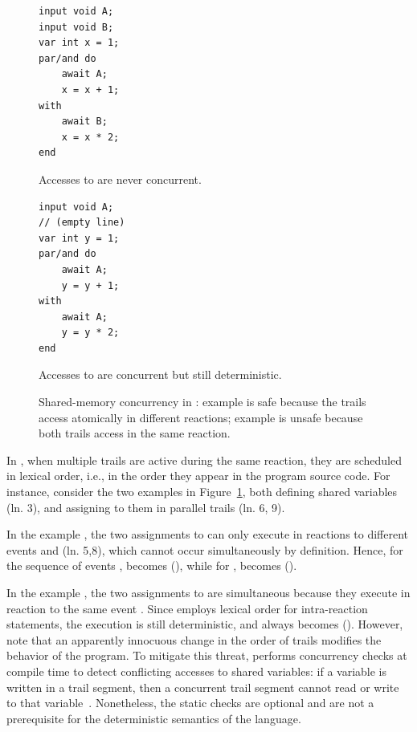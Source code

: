 \begin{figure}[h]
\begin{minipage}[h]{0.45\linewidth}
\begin{lstlisting}[numbers=right]
input void A;
input void B;
var int x = 1;
par/and do
    await A;
    x = x + 1;
with
    await B;
    x = x * 2;
end
\end{lstlisting}
\centering\small{\ax Accesses to  are never concurrent.}
\end{minipage}
%
\begin{minipage}[h]{0.53\linewidth}
\begin{lstlisting}[xleftmargin=2em]
input void A;
// (empty line)
var int y = 1;
par/and do
    await A;
    y = y + 1;
with
    await A;
    y = y * 2;
end

\end{lstlisting}
\centering\small{\bx Accesses to  are concurrent but still deterministic.}
\end{minipage}
\caption{ Shared-memory concurrency in \CEU:
example \ax is safe because the trails access  atomically in different
reactions;
example \bx is unsafe because both trails access  in the same reaction.
\label{lst.shared}
}
\end{figure}

In \CEU, when multiple trails are active during the same reaction, they are
scheduled in lexical order, i.e., in the order they appear in the program
source code.
%
For instance, consider the two examples in Figure~\ref{lst.shared}, both
defining shared variables (ln. 3), and assigning to them in parallel trails
(ln. 6, 9).

In the example \ax, the two assignments to  can only execute in
reactions to different events  and  (ln. 5,8), which cannot
occur simultaneously by definition.
Hence, for the sequence of events ,  becomes 
(), while for ,  becomes 
().

In the example \bx, the two assignments to  are simultaneous because
they execute in reaction to the same event .
Since \CEU employs lexical order for intra-reaction statements, the execution
is still deterministic, and  always becomes  ().
%
However, note that an apparently innocuous change in the order of trails
modifies the behavior of the program.
%
To mitigate this threat, \CEU performs concurrency checks at compile time to
detect conflicting accesses to shared variables:
if a variable is written in a trail segment, then a concurrent trail segment
cannot read or write to that variable~\cite{ceu.sensys13}.
%
Nonetheless, the static checks are optional and are not a prerequisite for the
deterministic semantics of the language.

